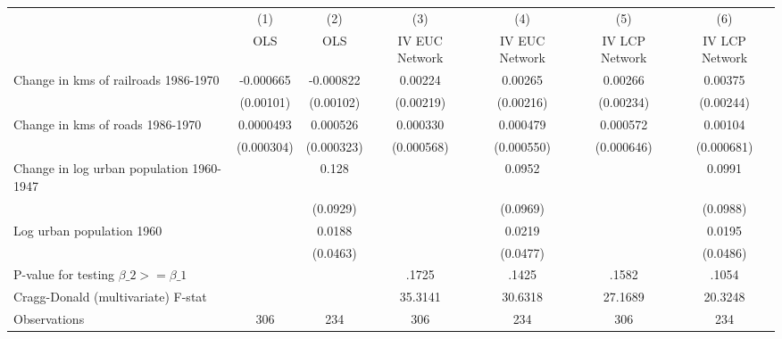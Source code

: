 {
\def\sym#1{\ifmmode^{#1}\else\(^{#1}\)\fi}
\begin{tabular}{l*{6}{c}}
\hline\hline
                &\multicolumn{1}{c}{(1)}&\multicolumn{1}{c}{(2)}&\multicolumn{1}{c}{(3)}&\multicolumn{1}{c}{(4)}&\multicolumn{1}{c}{(5)}&\multicolumn{1}{c}{(6)}\\
                &\multicolumn{1}{c}{OLS}&\multicolumn{1}{c}{OLS}&\multicolumn{1}{c}{IV EUC Network}&\multicolumn{1}{c}{IV EUC Network}&\multicolumn{1}{c}{IV LCP Network}&\multicolumn{1}{c}{IV LCP Network}\\
\hline
Change in kms of railroads 1986-1970&-0.000665         &-0.000822         &  0.00224         &  0.00265         &  0.00266         &  0.00375         \\
                &(0.00101)         &(0.00102)         &(0.00219)         &(0.00216)         &(0.00234)         &(0.00244)         \\
[1em]
Change in kms of roads 1986-1970&0.0000493         & 0.000526         & 0.000330         & 0.000479         & 0.000572         &  0.00104         \\
                &(0.000304)         &(0.000323)         &(0.000568)         &(0.000550)         &(0.000646)         &(0.000681)         \\
[1em]
Change in log urban population 1960-1947&                  &    0.128         &                  &   0.0952         &                  &   0.0991         \\
                &                  & (0.0929)         &                  & (0.0969)         &                  & (0.0988)         \\
[1em]
Log urban population 1960&                  &   0.0188         &                  &   0.0219         &                  &   0.0195         \\
                &                  & (0.0463)         &                  & (0.0477)         &                  & (0.0486)         \\
\hline
P-value for testing $\beta\_{2} >= \beta\_{1}$&                  &                  &    .1725         &    .1425         &    .1582         &    .1054         \\
Cragg-Donald (multivariate) F-stat&                  &                  &  35.3141         &  30.6318         &  27.1689         &  20.3248         \\
Observations    &      306         &      234         &      306         &      234         &      306         &      234         \\
\hline\hline
\end{tabular}
}
